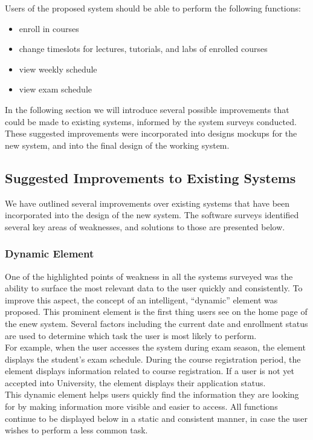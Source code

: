 \documentclass[10pt]{article}
\begin{document}
\begin{multicols}{2}
Users of the proposed system should be able to perform the following functions:
\begin{itemize}
\item enroll in courses
\item change timeslots for lectures, tutorials, and labs of enrolled courses
\item view weekly schedule
\item view exam schedule
\end{itemize}

In the following section we will introduce several possible improvements that 
could be made to existing systems, informed by the system surveys conducted. These suggested improvements were incorporated into designs mockups for the new system, and into the final design of the working system.

\subsection*{Suggested Improvements to Existing Systems}
We have outlined several improvements over existing systems that have been incorporated into the design of the new system. The software surveys identified 
several key areas of weaknesses, and solutions to those are presented below.

\subsubsection*{Dynamic Element}
One of the highlighted points of weakness in all the systems surveyed was the 
ability to surface the most relevant data to the user quickly and consistently. 
To improve this aspect, the concept of an intelligent, ``dynamic'' element was 
proposed. This prominent element is the first thing users see on the home page of the enew system. Several factors including the current date and enrollment 
status are used to determine which task the user is most likely to perform.\\

For example, when the user accesses the system during exam season, the element 
 displays the student's exam schedule. During the course registration period, 
the element displays information related to course registration. If a user 
is not yet accepted into University, the element displays their application 
status.\\

This dynamic element helps users quickly find the information they are 
looking for by making information more visible and easier to access. All functions continue to be 
displayed below in a static and consistent manner, in case the user wishes to perform a less common task.


\end{multicols}
\end{document}

